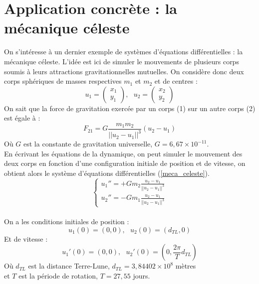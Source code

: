 \documentclass[a4paper,10pt]{report}
\begin{document}
\section{Application concrète : la mécanique céleste}
On s'intéresse à un dernier exemple de systèmes d'équations différentielles : la mécanique céleste. L'idée est ici de simuler le mouvements de plusieurs corps soumis à leurs attractions gravitationnelles mutuelles. On considère donc deux corps sphériques de masses respectives $m_1$ et $m_2$ et de centres :
\begin{displaymath}
u_1=\left( \begin{array}{c} x_1 \\ y_1 \end{array} \right), \ \ \ u_2=\left( \begin{array}{c} x_2 \\ y_2 \end{array} \right)
\end{displaymath}
On sait que la force de gravitation exercée par un corps (1) sur un autre corps (2) est égale à :
\begin{displaymath}
F_{21}=G \frac{m_1 m_2}{||u_2 - u_1||^3}(u_2-u_1)
\end{displaymath}
Où $G$ est la constante de gravitation universelle, $G=6,67\times 10^{-11}$.\\
En écrivant les équations de la dynamique, on peut simuler le mouvement des deux corps en fonction d'une configuration initiale de position et de vitesse, on obtient alors le système d'équations différentielles (\ref{meca_celeste}).
\begin{equation}
\label{meca_celeste}
\left\lbrace
\begin{array}{l}
u_1''=+G m_2 \frac{u_2 - u_1}{||u_2 - u_1||^3} \\
u_2''=-G m_1 \frac{u_2 - u_1}{||u_2 - u_1||^3}
\end{array}\right.
\end{equation}\\
On a les conditions initiales de position :
\begin{equation}
u_1(0)=(0,0), \ \ \ u_2(0)=(d_{TL},0)
\end{equation}
Et de vitesse :
\begin{equation}
u_1'(0)=(0,0), \ \ \ u_2'(0)=(0,\frac{2\pi}{T}d_{TL})
\end{equation}
Où $d_{TL}$ est la distance Terre-Lune, $d_{TL}=3,84402\times 10^8$ mètres\\ et $T$ est la période de rotation, $T=27,55$ jours.\\ \\
\end{document}
